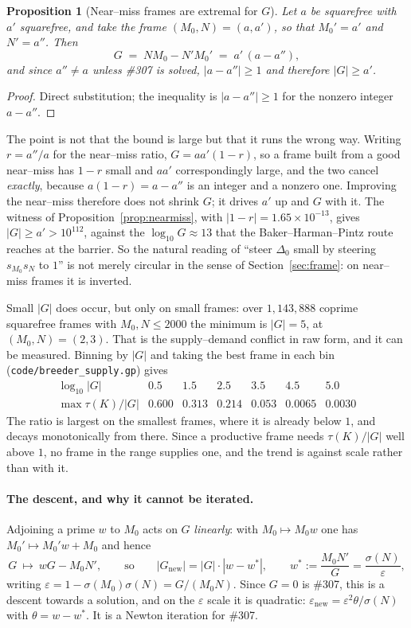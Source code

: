\documentclass[11pt]{article}
\newtheorem{proposition}[theorem]{Proposition}
\theoremstyle{definition}
\begin{document}
\begin{proposition}[Near--miss frames are extremal for $G$]\label{prop:nearframe}
Let $a$ be squarefree with $a'$ squarefree, and take the frame $(M_0,N)=(a,a')$, so that
$M_0'=a'$ and $N'=a''$. Then
\[ G\;=\;NM_0-N'M_0'\;=\;a'\,(a-a''), \]
and since $a''\ne a$ unless \#307 is solved, $|a-a''|\ge1$ and therefore $|G|\ge a'$.
\end{proposition}
\begin{proof}
Direct substitution; the inequality is $|a-a''|\ge1$ for the nonzero integer $a-a''$.
\end{proof}

The point is not that the bound is large but that it runs the wrong way. Writing $r=a''/a$ for the
near--miss ratio, $G=aa'(1-r)$, so a frame built from a good near--miss has $1-r$ small and $aa'$
correspondingly large, and the two cancel \emph{exactly}, because $a(1-r)=a-a''$ is an integer and a
nonzero one. Improving the near--miss therefore does not shrink $G$; it drives $a'$ up and $G$ with
it. The witness of Proposition~\ref{prop:nearmiss}, with $|1-r|=1.65\times10^{-13}$, gives
$|G|\ge a'>10^{112}$, against the $\log_{10}G\approx13$ that the Baker--Harman--Pintz route reaches
at the barrier. So the natural reading of ``steer $\Delta_0$ small by steering $s_{M_0}s_N$ to $1$''
is not merely circular in the sense of Section~\ref{sec:frame}: on near--miss frames it is inverted.

Small $|G|$ does occur, but only on small frames: over $1{,}143{,}888$ coprime squarefree frames with
$M_0,N\le2000$ the minimum is $|G|=5$, at $(M_0,N)=(2,3)$. That is the supply--demand conflict in raw
form, and it can be measured. Binning by $|G|$ and taking the best frame in each bin
(\texttt{code/breeder\_supply.gp}) gives
\[
\begin{array}{l|cccccc}
\log_{10}|G| & 0.5 & 1.5 & 2.5 & 3.5 & 4.5 & 5.0\\\hline
\max \tau(K)/|G| & 0.600 & 0.313 & 0.214 & 0.053 & 0.0065 & 0.0030
\end{array}
\]
The ratio is largest on the smallest frames, where it is already below $1$, and decays monotonically
from there. Since a productive frame needs $\tau(K)/|G|$ well above $1$, no frame in the range
supplies one, and the trend is against scale rather than with it.

\paragraph{The descent, and why it cannot be iterated.} Adjoining a prime $w$ to $M_0$ acts on
$G$ \emph{linearly}: with $M_0\mapsto M_0w$ one has $M_0'\mapsto M_0'w+M_0$ and hence
\[ G\ \longmapsto\ wG-M_0N', \qquad\text{so}\qquad |G_{\mathrm{new}}|=|G|\cdot|w-w^{*}|,
   \qquad w^{*}:=\frac{M_0N'}{G}=\frac{\sigma(N)}{\varepsilon}, \]
writing $\varepsilon=1-\sigma(M_0)\sigma(N)=G/(M_0N)$. Since $G=0$ is \#307, this is a descent
towards a solution, and on the $\varepsilon$ scale it is quadratic: $\varepsilon_{\mathrm{new}}
=\varepsilon^{2}\theta/\sigma(N)$ with $\theta=w-w^{*}$. It is a Newton iteration for \#307.
\end{document}
